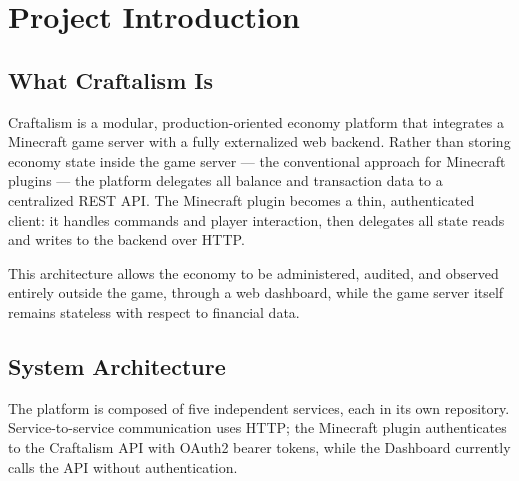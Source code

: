
\chapter*{Project Introduction}

\section*{What Craftalism Is}

Craftalism is a modular, production-oriented economy platform that integrates a Minecraft game server with a fully externalized web backend. Rather than storing economy state inside the game server — the conventional approach for Minecraft plugins — the platform delegates all balance and transaction data to a centralized REST API. The Minecraft plugin becomes a thin, authenticated client: it handles commands and player interaction, then delegates all state reads and writes to the backend over HTTP.

This architecture allows the economy to be administered, audited, and observed entirely outside the game, through a web dashboard, while the game server itself remains stateless with respect to financial data.

\section*{System Architecture}

The platform is composed of five independent services, each in its own repository. Service-to-service communication uses HTTP; the Minecraft plugin authenticates to the Craftalism API with OAuth2 bearer tokens, while the Dashboard currently calls the API without authentication.


